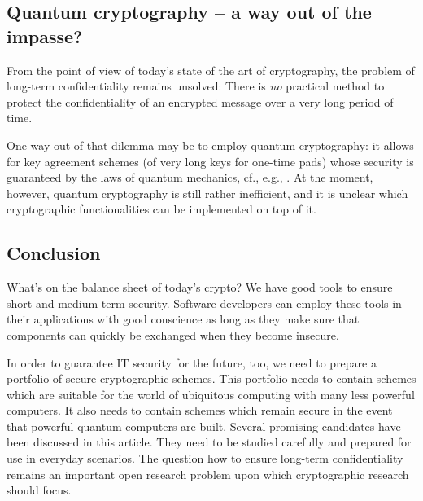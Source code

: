 \subsection{Quantum cryptography -- a way out of the impasse?}
\label{sec:quantum cryptography}

From the point of view of today's state of the art
of cryptography, the problem of long-term
confidentiality remains unsolved: There is
\emph{no} practical method to protect the
confidentiality of an encrypted message over a
very long period of time.

One way out of that dilemma may be to employ
quantum cryptography: it allows for key agreement
schemes (of very long keys for one-time pads)
whose security is
guaranteed by the laws of quantum mechanics,
cf., e.g., \cite{bennett/brassard:1984b}.  At the
moment, however, quantum cryptography is still
rather inefficient, and it is unclear which
cryptographic functionalities can be implemented
on top of it.


\subsection{Conclusion}
\label{sec:conclusion}

What's on the balance sheet of today's crypto?  We
have good tools to ensure short and medium term
security.  Software developers can employ these
tools in their applications with good conscience
as long as they make sure that components
can quickly be exchanged when they become
insecure.

In order to guarantee IT security for the future, too,
we need to prepare a portfolio of secure cryptographic
schemes.  This portfolio needs to contain schemes
which are suitable for the world of ubiquitous
computing with many less powerful computers.  It
also needs to contain schemes which remain secure
in the event that powerful quantum computers are
built.  Several promising candidates have been
discussed in this article.  They need to be
studied carefully and prepared for use in everyday
scenarios.  The question how to ensure long-term
confidentiality remains an important open research
problem upon which cryptographic research should
focus.

\putbib

